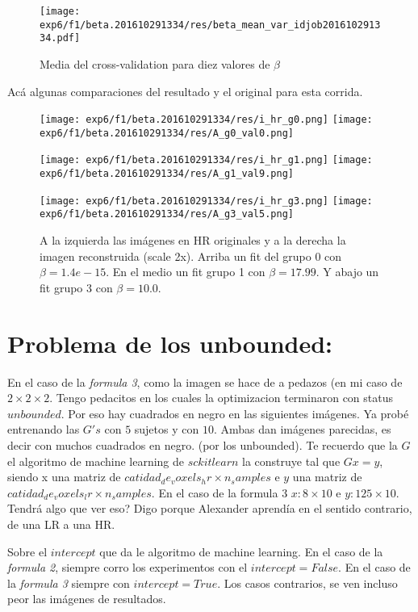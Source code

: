 \documentclass[a4paper,10pt]{article}
\begin{document}
\begin{figure}[H]
\texttt{[image: exp6/f1/beta.201610291334/res/beta\_mean\_var\_idjob201610291334.pdf]}
\caption{Media del cross-validation para diez valores de $\beta$ }
\label{varlambda}
\end{figure}



Acá algunas comparaciones del resultado y el original para esta corrida.


\begin{figure}[H]
\texttt{[image: exp6/f1/beta.201610291334/res/i\_hr\_g0.png]}
\texttt{[image: exp6/f1/beta.201610291334/res/A\_g0\_val0.png]}

\texttt{[image: exp6/f1/beta.201610291334/res/i\_hr\_g1.png]}
\texttt{[image: exp6/f1/beta.201610291334/res/A\_g1\_val9.png]}


\texttt{[image: exp6/f1/beta.201610291334/res/i\_hr\_g3.png]}
\texttt{[image: exp6/f1/beta.201610291334/res/A\_g3\_val5.png]}
\caption{A la izquierda las imágenes en HR originales y a la derecha la imagen reconstruida (scale 2x). Arriba un fit del grupo 0 con $\beta=1.4e-15$. En el medio un fit grupo 1 con $\beta=17.99$. Y abajo un fit grupo 3 con $\beta=10.0$.}
\label{rlambda}
\end{figure}


\section*{Problema de los unbounded:}

En el caso de la \textit{formula 3}, como la imagen se hace de a pedazos (en mi caso de $2\times 2 \times 2$. Tengo pedacitos en los cuales la optimizacion 
terminaron con status $unbounded$. Por eso hay cuadrados en negro en las siguientes imágenes.
Ya probé entrenando las $G's$ con $5$ sujetos y con $10$. Ambas dan imágenes parecidas, es decir con muchos cuadrados en negro. 
(por los unbounded). Te recuerdo que la $G$ el algoritmo de machine learning de $sckitlearn$ la construye tal que $Gx=y$, 
siendo x una matriz de $catidad_de_voxels_hr \times n_samples$ e $y$ una matriz de $catidad_de_voxels_lr \times n_samples$. 
En el caso de la formula 3 $x: 8\times10$ e $y:125\times10$. Tendrá algo que ver eso? Digo porque Alexander aprendía en el sentido 
contrario, de una LR a una HR. 


Sobre el $intercept$ que da le algoritmo de machine learning. En el caso de la \textit{formula 2}, siempre corro los experimentos con 
el $intercept=False$. En el caso de la \textit{formula 3} siempre con $intercept=True$. Los casos contrarios, se ven incluso peor las 
imágenes de resultados.
\end{document}
